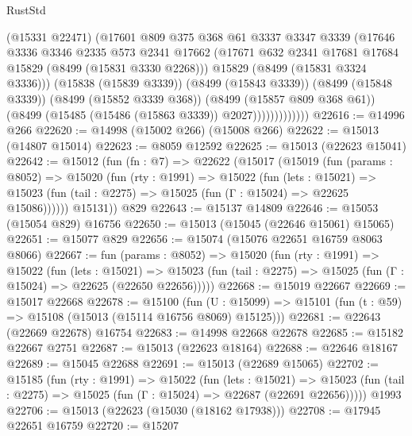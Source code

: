 \begin{lexlean}{RustStd}
\begin{coremodule}
                        (@15331 @22471)
                        (@17601
                          @809
                          @375
                          @368
                          @61
                          @3337
                          @3347
                          @3339
                          (@17646
                            @3336
                            @3346
                            @2335
                            @573
                            @2341
                            @17662
                            (@17671 @632 @2341 @17681 @17684 @15829 (@8499 (@15831 @3330 @2268)))
                            @15829
                            (@8499 (@15831 @3324 @3336)))
                          (@15838 (@15839 @3339))
                          (@8499 (@15843 @3339))
                          (@8499 (@15848 @3339))
                          (@8499 (@15852 @3339 @368))
                          (@8499 (@15857 @809 @368 @61))
                          (@8499 (@15485 (@15486 (@15863 @3339)) @2027)))))))))))))
@22616 := @14996 @266
@22620 := @14998 (@15002 @266) (@15008 @266)
@22622 := @15013 (@14807 @15014)
@22623 := @8059 @12592
@22625 := @15013 (@22623 @15041)
@22642 := @15012
    (fun (fn : @7) =>
    @22622
      (@15017
        (@15019
          (fun (params : @8052) =>
          @15020
            (fun (rty : @1991) =>
            @15022
              (fun (lets : @15021) =>
              @15023 (fun (tail : @2275) => @15025 (fun (Γ : @15024) => @22625 @15086))))))
        @15131))
    @829
@22643 := @15137 @14809
@22646 := @15053 (@15054 @829) @16756
@22650 := @15013 (@15045 (@22646 @15061) @15065)
@22651 := @15077 @829
@22656 := @15074 (@15076 @22651 @16759 @8063 @8066)
@22667 := fun (params : @8052) =>
  @15020
    (fun (rty : @1991) =>
    @15022
      (fun (lets : @15021) =>
      @15023 (fun (tail : @2275) => @15025 (fun (Γ : @15024) => @22625 (@22650 @22656)))))
@22668 := @15019 @22667
@22669 := @15017 @22668
@22678 := @15100
    (fun (U : @15099) => @15101 (fun (t : @59) => @15108 (@15013 (@15114 @16756 @8069) @15125)))
@22681 := @22643 (@22669 @22678) @16754
@22683 := @14998 @22668 @22678
@22685 := @15182 @22667 @2751
@22687 := @15013 (@22623 @18164)
@22688 := @22646 @18167
@22689 := @15045 @22688
@22691 := @15013 (@22689 @15065)
@22702 := @15185
    (fun (rty : @1991) =>
    @15022
      (fun (lets : @15021) =>
      @15023 (fun (tail : @2275) => @15025 (fun (Γ : @15024) => @22687 (@22691 @22656)))))
    @1993
@22706 := @15013 (@22623 (@15030 (@18162 @17938)))
@22708 := @17945 @22651 @16759
@22720 := @15207

\end{coremodule}
\end{lexlean}
